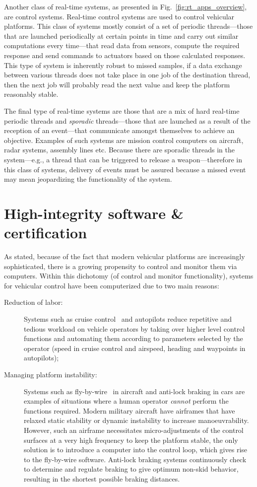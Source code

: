 Another class of real-time systems, as presented in
Fig.~\ref{fig:rt_apps_overview}, are control systems. Real-time
control systems are used to control vehicular platforms. This class of
systems mostly consist of a set of periodic threads---those that are
launched periodically at certain points in time and carry out similar
computations every time---that read data from sensors, compute the
required response and send commands to actuators based on those
calculated responses. This type of system is inherently robust to
missed samples, if a data exchange between various threads does not
take place in one job of the destination thread, then the next job
will probably read the next value and keep the platform reasonably
stable.

The final type of real-time systems are those that are a mix of hard
real-time periodic threads and \emph{sporadic} threads---those that
are launched as a result of the reception of an event---that
communicate amongst themselves to achieve an objective. Examples of
such systems are mission control computers on aircraft, radar systems,
assembly lines etc. Because there are sporadic threads in the
system---e.g., a thread that can be triggered to release a
weapon---therefore in this class of systems, delivery of events must
be assured because a missed event may mean jeopardizing the
functionality of the system.

\section{High-integrity software \& certification}
As stated, because of the fact that modern vehicular platforms are
increasingly sophisticated, there is a growing propensity to control
and monitor them via computers. Within this dichotomy (of control and
monitor functionality), systems for vehicular control have been
computerized due to two main reasons:

\begin{description}
\item[Reduction of labor:]{Systems such as cruise
  control~\cite{jones@jpam90} and autopilots reduce repetitive and
  tedious workload on vehicle operators by taking over higher level
  control functions and automating them according to parameters
  selected by the operator (speed in cruise control and airspeed,
  heading and waypoints in autopilots);}
\item[Managing platform instability:]{Systems such as
  fly-by-wire~\cite{langer@rtsep92} in aircraft and anti-lock braking
  in cars are examples of situations where a human operator
  \emph{cannot} perform the functions required. Modern military
  aircraft have airframes that have relaxed static stability or
  dynamic instability to increase manoeuvrability.  However, such an
  airframe necessitates micro-adjustments of the control surfaces at a
  very high frequency to keep the platform stable, the only solution
  is to introduce a computer into the control loop, which gives rise
  to the fly-by-wire software. Anti-lock braking systems continuously
  check to determine and regulate braking to give optimum non-skid
  behavior, resulting in the shortest possible braking distances.}
\end{description}

